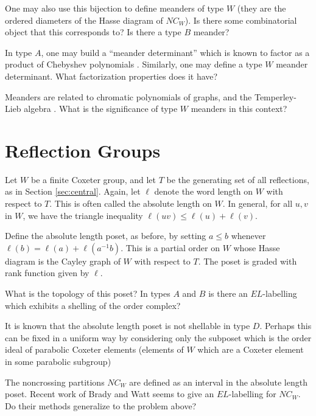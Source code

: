 \documentclass[12pt,letterpaper, reqno]{amsart}
\begin{document}
\begin{problemblock}
\begin{problem}
One may also use this bijection to define meanders of type $W$ (they are the ordered diameters of the Hasse diagram of $NC_W$). Is there some combinatorial object that this corresponds to? Is there a type $B$ meander?
\end{problem}

\begin{remark}
 In type $A$, one may build a ``meander determinant'' which is known to factor as a product of Chebyshev polynomials \cite{difrancesco}. Similarly, one may define a type $W$ meander determinant. What factorization properties does it have?

Meanders are related to chromatic polynomials of graphs, and the Temperley-Lieb algebra \cite{cautis-jackson}. What is the significance of type $W$ meanders in this context?
\end{remark}

\end{problemblock}

\section{Reflection Groups}

\begin{problemblock} Let $W$ be a finite Coxeter group, and let $T$ be the generating set of all reflections, as in Section \ref{sec:central}. Again, let $\ell$ denote the word length on $W$ with respect to $T$. This is often called the {\sf absolute length} on $W$. In general, for all $u,v$ in $W$, we have the triangle inequality $\ell(uv)\leq \ell(u)+\ell(v)$.

Define the {\sf absolute length poset}, as before, by setting $a\leq b$ whenever $\ell(b)=\ell(a)+\ell(a^{-1}b)$. This is a partial order on $W$ whose Hasse diagram is the Cayley graph of $W$ with respect to $T$. The poset is graded with rank function given by $\ell$.

\begin{problem} 
What is the topology of this poset? In types $A$ and $B$ is there an $EL$-labelling which exhibits a shelling of the order complex?
\end{problem}

 It is known that the absolute length poset is not shellable in type $D$. Perhaps this can be fixed in a uniform way by considering only the subposet which is the order ideal of parabolic Coxeter elements (elements of $W$ which are a Coxeter element in some parabolic subgroup)

\begin{remark} The noncrossing partitions $NC_W$ are defined as an interval in the absolute length poset. Recent work of Brady and Watt \cite{brady-watt} seems to give an $EL$-labelling for $NC_W$. Do their methods generalize to the problem above?\end{remark}

\end{problemblock}
\end{document}
